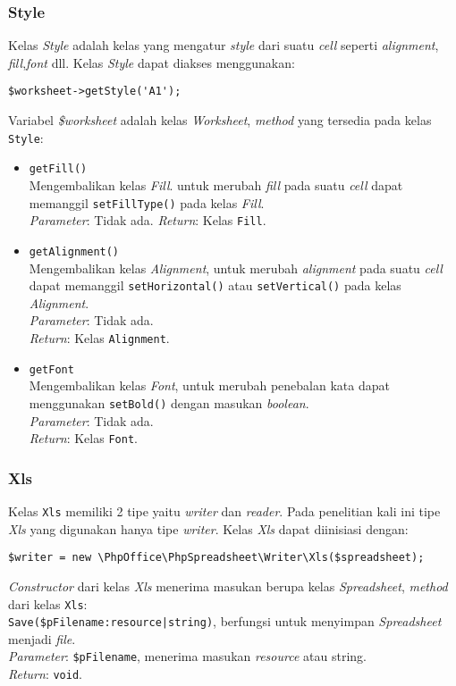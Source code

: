 \subsubsection{Style}
Kelas \textit{Style} adalah kelas yang mengatur \textit{style} dari suatu \textit{cell} seperti \textit{alignment}, \textit{fill},\textit{font} dll. Kelas \textit{Style} dapat diakses menggunakan:
\begin{lstlisting}
$worksheet->getStyle('A1');
\end{lstlisting}
Variabel \textit{\$worksheet} adalah kelas \textit{Worksheet}, \textit{method} yang tersedia pada kelas \texttt{Style}:
	\begin{itemize}
		\item \texttt{getFill()} \\
		 Mengembalikan kelas \textit{Fill}. untuk merubah \textit{fill} pada suatu \textit{cell} dapat memanggil \texttt{set\-Fill\-Type()} pada kelas \textit{Fill}.	\\
		 \textit{Parameter}: Tidak ada.
		 \textit{Return}: Kelas \texttt{Fill}.
		\item \texttt{getAlignment()} \\
		 Mengembalikan kelas \textit{Alignment}, untuk merubah \textit{alignment} pada suatu \textit{cell} dapat memanggil \texttt{setHorizontal()} atau \texttt{setVertical()} pada kelas \textit{Alignment}. \\
		\textit{Parameter}: Tidak ada. \\
		\textit{Return}: Kelas \texttt{Alignment}.
		\item \texttt{getFont} \\
		 Mengembalikan kelas \textit{Font}, untuk merubah penebalan kata dapat menggunakan \texttt{setBold()} dengan masukan \textit{boolean}. \\
		\textit{Parameter}: Tidak ada. \\
		\textit{Return}: Kelas \texttt{Font}.
		
	\end{itemize}

\subsubsection{Xls} 
Kelas \texttt{Xls} memiliki 2 tipe yaitu \textit{writer} dan \textit{reader}. Pada penelitian kali ini tipe \textit{Xls} yang digunakan hanya tipe \textit{writer}. Kelas \textit{Xls} dapat diinisiasi dengan:
\begin{lstlisting}
$writer = new \PhpOffice\PhpSpreadsheet\Writer\Xls($spreadsheet);
\end{lstlisting}
\textit{Constructor} dari kelas \textit{Xls} menerima masukan berupa kelas \textit{Spreadsheet}, \textit{method} dari kelas \texttt{Xls}: \\
\texttt{Save(\$pFilename:resource|string)}, berfungsi untuk menyimpan \textit{Spreadsheet} menjadi \textit{file}. \\
\textit{Parameter}: \texttt{\$pFilename}, menerima masukan \textit{resource} atau string. \\
\textit{Return}: \texttt{void}. 





